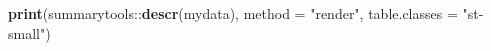 \documentclass[
]{article}
\newenvironment{Shaded}{\begin{snugshade}}{\end{snugshade}}
\newcommand{\DataTypeTok}[1]{\textcolor[rgb]{0.00,0.34,0.68}{#1}}
\newcommand{\DecValTok}[1]{\textcolor[rgb]{0.69,0.50,0.00}{#1}}
\newcommand{\KeywordTok}[1]{\textcolor[rgb]{0.12,0.11,0.11}{\textbf{#1}}}
\newcommand{\NormalTok}[1]{\textcolor[rgb]{0.12,0.11,0.11}{#1}}
\newcommand{\OperatorTok}[1]{\textcolor[rgb]{0.12,0.11,0.11}{#1}}
\newcommand{\OtherTok}[1]{\textcolor[rgb]{0.00,0.43,0.16}{#1}}
\newcommand{\StringTok}[1]{\textcolor[rgb]{0.75,0.01,0.01}{#1}}
\begin{document}
\begin{Shaded}
\begin{Highlighting}[]
\KeywordTok{print}\NormalTok{(summarytools}\OperatorTok{::}\KeywordTok{descr}\NormalTok{(mydata), }\DataTypeTok{method =} \StringTok{"render"}\NormalTok{, }\DataTypeTok{table.classes =} \StringTok{"st-small"}\NormalTok{)}
\end{Highlighting}
\end{Shaded}

\begin{Shaded}
\end{Shaded}

\begin{Shaded}
\end{Shaded}

\begin{Shaded}
\end{Shaded}

\begin{Shaded}
\end{Shaded}
\end{document}
